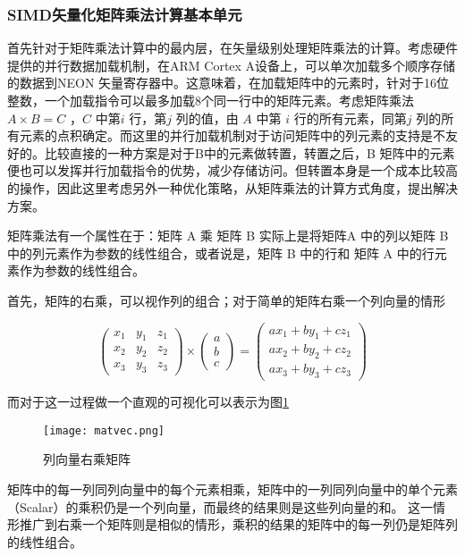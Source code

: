 \subsubsection{SIMD矢量化矩阵乘法计算基本单元}
\label{sec:linear-matmul}

首先针对于矩阵乘法计算中的最内层，在矢量级别处理矩阵乘法的计算。考虑硬件提供的并行数据加载机制，在ARM Cortex A设备上，可以单次加载多个顺序存储的数据到NEON 矢量寄存器中。这意味着，在加载矩阵中的元素时，针对于16位整数，一个加载指令可以最多加载8个同一行中的矩阵元素。考虑矩阵乘法 $A \times B = C$ ，$ C$ 中第$ i$ 行，第$j$ 列的值，由 $A$ 中第 $i$ 行的所有元素，同第$j$ 列的所有元素的点积确定。而这里的并行加载机制对于访问矩阵中的列元素的支持是不友好的。比较直接的一种方案是对于B中的元素做转置，转置之后，B 矩阵中的元素便也可以发挥并行加载指令的优势，减少存储访问。但转置本身是一个成本比较高的操作，因此这里考虑另外一种优化策略，从矩阵乘法的计算方式角度，提出解决方案。

矩阵乘法有一个属性在于：矩阵 A 乘 矩阵 B 实际上是将矩阵A 中的列以矩阵 B 中的列元素作为参数的线性组合，或者说是，矩阵 B 中的行和
矩阵 A 中的行元素作为参数的线性组合。

首先，矩阵的右乘，可以视作列的组合；对于简单的矩阵右乘一个列向量的情形

\begin{equation}
  \begin{pmatrix}
    x_1 & y_1 & z_1\\
    x_2 & y_2 & z_2\\  
    x_3 & y_3 & z_3
  \end{pmatrix}
  \times 
  \begin{pmatrix}
    a \\
    b \\
    c
  \end{pmatrix}
  = 
  \begin{pmatrix}
    ax_1 + by_1 + cz_1\\
    ax_2 + by_2 + cz_2\\  
    ax_3 + by_3 + cz_3
  \end{pmatrix}
\end{equation}

而对于这一过程做一个直观的可视化可以表示为图\ref{fig:matvec}

\begin{figure}
\centering
\texttt{[image: matvec.png]}
\caption{列向量右乘矩阵}
\label{fig:matvec}
\end{figure}

矩阵中的每一列同列向量中的每个元素相乘，矩阵中的一列同列向量中的单个元素（Scalar）的乘积仍是一个列向量，而最终的结果则是这些列向量的和。
这一情形推广到右乘一个矩阵则是相似的情形，乘积的结果的矩阵中的每一列仍是矩阵列的线性组合。

